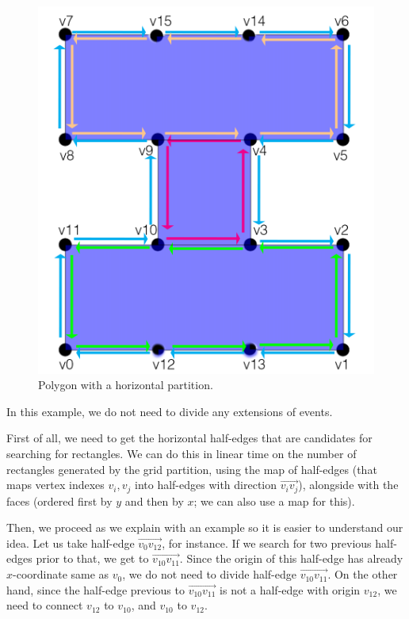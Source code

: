 \documentclass[12pt,a4paper,oneside]{article}
\begin{document}
\begin{figure}[h!]
  \centering \includegraphics[scale=0.2]{second.png}
  \caption{Polygon with a horizontal partition.}
  \label{fig:idea}
\end{figure}

In this example, we do not need to divide any extensions of events.

First of all, we need to get the horizontal half-edges that are candidates for searching for rectangles. We can do this in linear time on the number of rectangles generated by the grid partition, using the map of half-edges (that maps vertex indexes $v_{i}, v_{j}$ into half-edges with direction $\overrightarrow{v_{i} v_{j}}$), alongside with the faces (ordered first by $y$ and then by $x$; we can also use a map for this).

Then, we proceed as we explain with an example so it is easier to understand our idea. Let us take half-edge $\overrightarrow{v_{0}  v_{12}}$, for instance. If we search for two previous half-edges prior to that, we get to $\overrightarrow{v_{10} v_{11}}$. Since the origin of this half-edge has already $x$-coordinate same as $v_{0}$, we do not need to divide half-edge $\overrightarrow{v_{10} v_{11}}$. On the other hand, since the half-edge previous to $\overrightarrow{v_{10} v_{11}}$ is not a half-edge with origin $v_{12}$, we need to connect $v_{12}$ to $v_{10}$, and $v_{10}$ to $v_{12}$.
\end{document}

